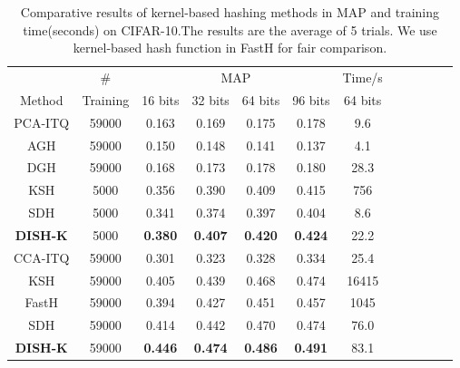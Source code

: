 \documentclass[conference]{IEEEtran}
\begin{document}
\begin{table}[t]
    \centering
    \footnotesize 
    \begin{tabular}{c|c|cccc|cccc|c|c}
        \hline
         & \#  & \multicolumn{4}{c|}{MAP}  & Time/s \\ 
        Method & Training & 16 bits & 32 bits & 64 bits & 96 bits & 64 bits\\ 
        \hline
        PCA-ITQ & 59000 & 0.163 & 0.169 & 0.175 & 0.178 & 9.6 \\ 
        AGH & 59000 & 0.150 & 0.148 & 0.141 & 0.137 & 4.1 \\ 
        DGH & 59000 & 0.168 & 0.173 & 0.178 & 0.180 & 28.3 \\
        \hline
        KSH & 5000 & 0.356 & 0.390 & 0.409 & 0.415 & 756 \\ 
        SDH & 5000 & 0.341 & 0.374 & 0.397 & 0.404 & 8.6 \\ 
        \textbf{DISH-K} & 5000 & \textbf{0.380} & \textbf{0.407} & \textbf{0.420} & \textbf{0.424} & 22.2 \\
        \hline
        CCA-ITQ & 59000 & 0.301 & 0.323 & 0.328 & 0.334 & 25.4 \\ 
        KSH & 59000 & 0.405 & 0.439 & 0.468 & 0.474 & 16415 \\ 
        FastH & 59000 & 0.394 & 0.427 & 0.451 & 0.457 & 1045 \\ 
        SDH & 59000 & 0.414 & 0.442 & 0.470 & 0.474 & 76.0 \\ 
        \textbf{DISH-K} & 59000 & \textbf{0.446} & \textbf{0.474} & \textbf{0.486} & \textbf{0.491} & 83.1\\ 
        \hline
    \end{tabular}
    \caption{Comparative results of kernel-based hashing methods in MAP and training time(seconds) on CIFAR-10.The results are the average of 5 trials. We use kernel-based hash function in FastH for fair comparison.}
    \label{tab:cifar10}
\end{table}
\end{document}

